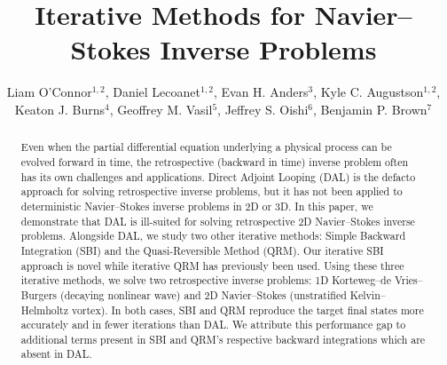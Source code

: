 \documentclass[%
 reprint,
 amsmath,amssymb,
 aps,
 pre,
]{revtex4-2}
\begin{document}

\title{Iterative Methods for Navier--Stokes Inverse Problems}

\author{Liam O'Connor$^{1,2}$, Daniel Lecoanet$^{1,2}$, Evan H. Anders$^{3}$, Kyle C. Augustson$^{1,2}$, Keaton J. Burns$^{4}$, Geoffrey M. Vasil$^{5}$, Jeffrey S. Oishi$^{6}$, Benjamin P. Brown$^{7}$}

\address{$^1$Department of Engineering Sciences and Applied Mathematics, Northwestern University, Evanston, IL, 60208 USA}
\address{$^2$Center for Interdisciplinary Exploration and Research in Astrophysics, Northwestern University, Evanston, IL, 60201 USA}
\address{$^3$Kavli Institute for Theoretical Physics, University of California Santa Barbara, Santa Barbara, CA, 93106 USA}
\address{$^4$Department of Mathematics, Massachusetts Institute of Technology, Cambridge, MA, 02142 USA}
\address{$^5$School of Mathematics, Edinburgh University, EH9 3FD, UK}
\address{$^6$Department of Physics and Astronomy, Bates College, Lewiston, ME, 04240 USA}
\address{$^7$Department of Astrophysical and Planetary Sciences, University of Colorado Boulder, Boulder, CO, 80309 USA}

\begin{abstract}
  Even when the partial differential equation underlying a physical process can be evolved forward in time, the retrospective (backward in time) inverse problem often has its own challenges and applications.
  Direct Adjoint Looping (DAL) is the defacto approach for solving retrospective inverse problems, but it has not been applied to deterministic Navier--Stokes inverse problems in 2D or 3D.
  In this paper, we demonstrate that DAL is ill-suited for solving retrospective 2D Navier--Stokes inverse problems. 
  Alongside DAL, we study two other iterative methods: Simple Backward Integration (SBI) and the Quasi-Reversible Method (QRM).
  Our iterative SBI approach is novel while iterative QRM has previously been used.
  Using these three iterative methods, we solve two retrospective inverse problems:
  1D Korteweg--de Vries--Burgers (decaying nonlinear wave) and 2D Navier--Stokes (unstratified Kelvin--Helmholtz vortex).
  In both cases, SBI and QRM reproduce the target final states more accurately and in fewer iterations than DAL.
  We attribute this performance gap to additional terms present in SBI and QRM's respective backward integrations which are absent in DAL.
\end{abstract}
\end{document}
